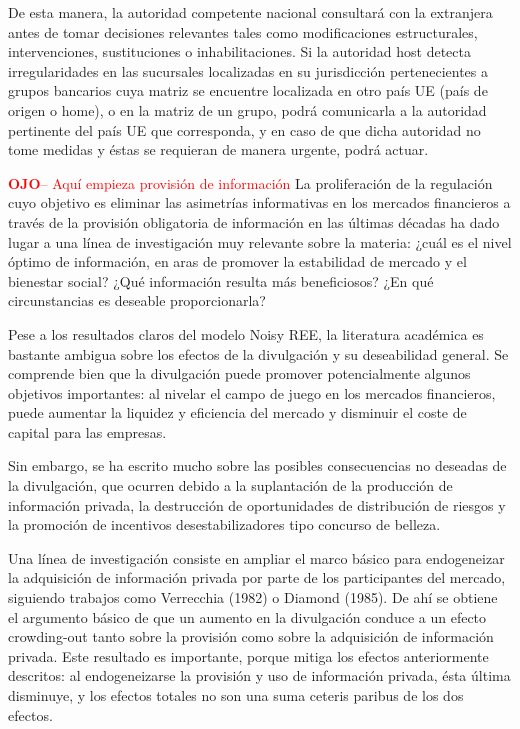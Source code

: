 \documentclass[10pt,a4paper]{article}
\begin{document}
De esta manera, la autoridad competente nacional consultará con la extranjera antes de tomar decisiones relevantes tales como modificaciones estructurales, intervenciones, sustituciones o inhabilitaciones. Si la autoridad host detecta irregularidades en las sucursales localizadas en su jurisdicción pertenecientes a grupos bancarios cuya matriz se encuentre localizada en otro país UE (país de origen o home), o en la matriz de un grupo, podrá comunicarla a la autoridad pertinente del país UE que corresponda, y en caso de que dicha autoridad no tome medidas y éstas se requieran de manera urgente, podrá actuar.





\textcolor{red}{\textbf{OJO}-- Aquí empieza provisión de información}
La proliferación de la regulación cuyo objetivo es eliminar las asimetrías informativas en los mercados financieros a través de la provisión obligatoria de información en las últimas décadas ha dado lugar a una línea de investigación muy relevante sobre la materia: ¿cuál es el nivel óptimo de información, en aras de promover la estabilidad de mercado y el bienestar social? ¿Qué información resulta más beneficiosos? ¿En qué circunstancias es deseable proporcionarla? 

Pese a los resultados claros del modelo Noisy REE, la literatura académica es bastante ambigua sobre los efectos de la divulgación y su deseabilidad general. Se comprende bien que la divulgación puede promover potencialmente algunos objetivos importantes: al nivelar el campo de juego en los mercados financieros, puede aumentar la liquidez y eficiencia del mercado y disminuir el coste de capital para las empresas. 

Sin embargo, se ha escrito mucho sobre las posibles consecuencias no deseadas de la divulgación, que ocurren debido a la suplantación de la producción de información privada, la destrucción de oportunidades de distribución de riesgos y la promoción de incentivos desestabilizadores tipo concurso de belleza. 

Una línea de investigación consiste en ampliar el marco básico para endogeneizar la adquisición de información privada por parte de los participantes del mercado, siguiendo trabajos como Verrecchia (1982) o Diamond (1985). De ahí se obtiene el argumento básico de que un aumento en la divulgación conduce a un efecto crowding-out tanto sobre la provisión como sobre la adquisición de información privada. Este resultado es importante, porque mitiga los efectos anteriormente descritos: al endogeneizarse la provisión y uso de información privada, ésta última disminuye, y los efectos totales no son una suma ceteris paribus de los dos efectos. 
\end{document}
